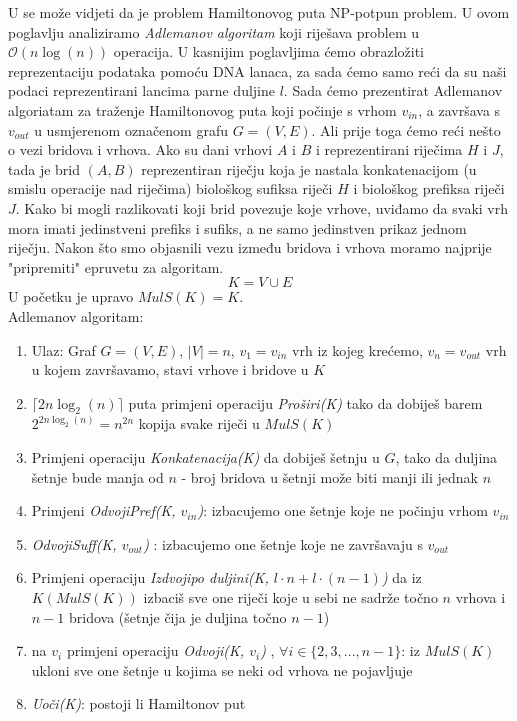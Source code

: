 \documentclass[a4paper,oneside,12pt]{memoir} %
\begin{document}
\begin{spacing}{1.5}
U \cite[s. ~286-291]{Sipser} se može vidjeti da je problem Hamiltonovog puta NP-potpun problem. U ovom poglavlju analiziramo \textit{Adlemanov algoritam} koji riješava problem u $\mathcal{O}(n \log (n))$ operacija. U kasnijim poglavljima ćemo obrazložiti reprezentaciju podataka pomoću DNA lanaca, za sada ćemo samo reći da su naši podaci reprezentirani lancima parne duljine $l$. Sada ćemo prezentirat Adlemanov algoriatam za traženje Hamiltonovog puta koji počinje s vrhom $v_{in}$, a završava s $v_{out}$ u usmjerenom označenom grafu $G=(V,E)$. Ali prije toga ćemo reći nešto o vezi bridova i vrhova. Ako su dani vrhovi $A$ i $B$ i reprezentirani riječima $H$ i $J$, tada je brid $(A,B)$ reprezentiran riječju koja je nastala konkatenacijom (u smislu operacije nad riječima) biološkog sufiksa riječi $H$ i biološkog prefiksa riječi $J$. Kako bi mogli razlikovati koji brid povezuje koje vrhove, uviđamo da svaki vrh mora imati jedinstveni prefiks i sufiks, a ne samo jedinstven prikaz jednom riječju. 
    Nakon što smo objasnili vezu između bridova i vrhova moramo najprije "pripremiti" epruvetu za algoritam. \[K=V\cup E\]
    U početku je upravo $MulS(K)=K$.\\
    \indent Adlemanov algoritam:
    \begin{enumerate}
        \item Ulaz: Graf $G=(V,E)$, $|V|=n$, $v_1=v_{in}$ vrh iz kojeg krećemo, $v_n=v_{out}$ vrh u kojem završavamo, stavi vrhove i bridove u $K$
        \item $ \lceil 2n\log_{2}(n) \rceil$ puta primjeni operaciju \textit{Proširi(K)} tako da dobiješ barem $2^{2n\log_{2}(n)}=n^{2n}$ kopija svake riječi u $MulS(K)$
        \item Primjeni operaciju \textit{Konkatenacija(K)} da dobiješ šetnju u $G$, tako da duljina šetnje bude manja od $n$ - broj bridova u šetnji može biti manji ili jednak $n$
        \item Primjeni \textit{Odvoji\textunderscore Pref(K, $v_{in}$)}: izbacujemo one šetnje koje ne počinju vrhom $v_{in}$
        \item  \textit{Odvoji\textunderscore Suff(K, $v_{out}$)} : izbacujemo one šetnje koje ne završavaju s $v_{out}$
        \item Primjeni operaciju \textit{Izdvoji\textunderscore po \textunderscore duljini(K, $l\cdot n + l\cdot (n-1) $)} da iz $K (MulS(K))$ izbaciš sve one riječi koje u sebi ne sadrže točno $n$ vrhova i $n-1$ bridova (šetnje čija je duljina točno $n-1$)
        \item na $v_i$ primjeni operaciju \textit{Odvoji(K, $v_i$)} , $\forall{i} \in \{2,3,...,n-1\}$: iz $MulS(K)$ ukloni sve one šetnje u kojima se neki od vrhova ne pojavljuje
        \item \textit{Uoči(K)}: postoji li Hamiltonov put
    \end{enumerate}



\end{spacing}
\end{document}
